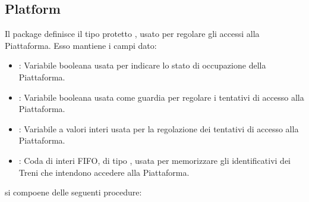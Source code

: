 	\subsection{Platform} 
	
	Il package  definisce il tipo protetto , usato per regolare gli accessi alla Piattaforma. Esso mantiene i campi dato:
	\begin{itemize}
		\item {}: Variabile booleana usata per indicare lo stato di occupazione della Piattaforma.

		\item {}: Variabile booleana usata come guardia per regolare i tentativi di accesso alla Piattaforma.

		\item {}: Variabile a valori interi usata per la regolazione dei tentativi di accesso alla Piattaforma.
		
		\item {}: Coda di interi FIFO, di tipo , usata per memorizzare gli identificativi dei Treni che intendono accedere alla Piattaforma.
	\end{itemize}
	 si compoene delle seguenti procedure:
	
